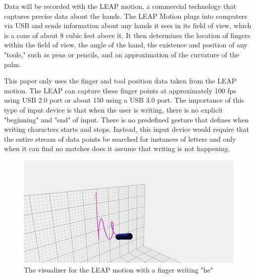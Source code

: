 Data will be recorded with the LEAP motion, a commercial technology that captures precise data about the hands.
The LEAP Motion plugs into computers via USB and sends information about any hands it sees in its field of view, which is a cone of about 8 cubic feet above it.
It then determines the location of fingers within the field of view, the angle of the hand, the existence and position of any "tools," such as pens or pencils, and an approximation of the curvature of the palm.

This paper only uses the finger  and tool position data taken from the LEAP motion. The LEAP can capture these finger points at approximately 100 fps using USB 2.0 port or about 150 using a USB 3.0 port.
The importance of this type of input device is that when the user is writing, there is no explicit "beginning" and "end" of input. There is no predefined gesture that defines when writing characters starts and stops. Instead, this input device would require that the entire stream of data points be searched for instances of letters and only when it can find no matches does it assume that writing is not happening.
\begin{figure}
  \begin{center}
  \includegraphics[width=\columnwidth]{images/he-white.PNG}
  \caption{The visualizer for the LEAP motion with a finger writing "he"}
  \label{fig:teaser}
  \end{center}  
\end{figure}
